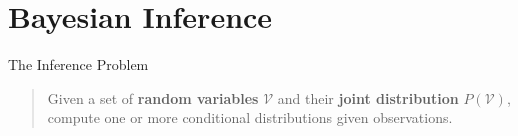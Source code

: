 \documentclass[10pt,usenames,dvipsnames]{beamer}
\begin{document}


\section{Bayesian Inference}


\begin{frame}{The Inference Problem}
  \begin{small}
    \begin{quote} 
      Given a set of \textbf{random variables} $\mathcal{V}$ and their
      \textbf{joint distribution} $P(\mathcal{V})$,\\ compute one or more conditional
      distributions given observations.
    \end{quote}
  \end{small}
\end{frame}
\end{document}

